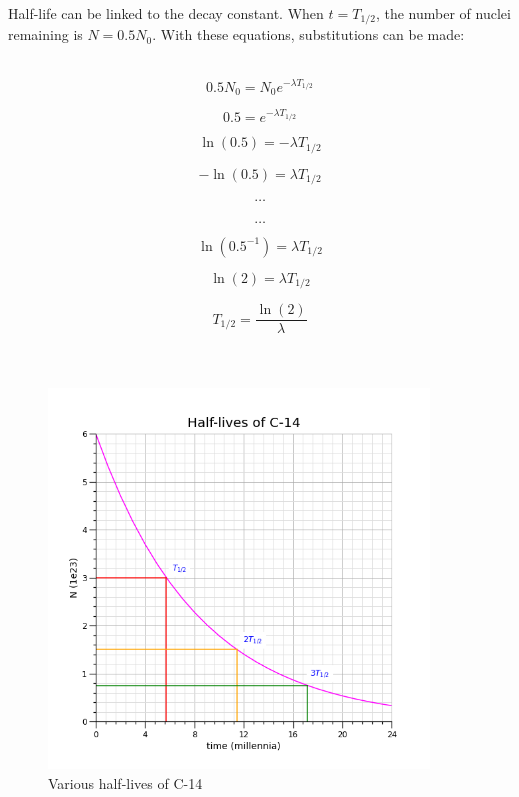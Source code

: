 \documentclass[12pt]{article}
\begin{document}
Half-life can be linked to the decay constant. When \(t= T_{1/2}\), the number of nuclei remaining is \(N = 0.5N_0\). With these equations, substitutions can be made:


\begin{figure}[H]
\centering
\begin{minipage}{0.8\textwidth}
\begin{tcolorbox}[
sharp corners=all,
colback=white,
colframe=white,
size=tight,
boxrule=0.2mm,
left=10mm, right=10mm,
]
\begin{multicols}{2}
\noindent
\\
\[0.5N_0 = N_0 e^{-\lambda T_{1/2}}\]

\[0.5 = e^{-\lambda T_{1/2}}\]

\[\ln (0.5) = -\lambda T_{1/2}\]

\[-\ln (0.5) = \lambda T_{1/2}\]

\[\textbf{\ldots}\]
\columnbreak
\\
\[\textbf{\ldots}\]

\[\ln (0.5^{-1}) = \lambda T_{1/2}\]

\[\ln (2) = \lambda T_{1/2}\]

\[T_{1/2} = \dfrac{\ln(2)}{\lambda}\]
\\
\\
\end{multicols}
\end{tcolorbox}
\end{minipage}
\end{figure}

\begin{figure}[H]
\centering
\includegraphics[width=0.9\textwidth,keepaspectratio]{./images/c-14_t_half.png}
\caption{Various half-lives of C-14}
\end{figure}
\end{document}

